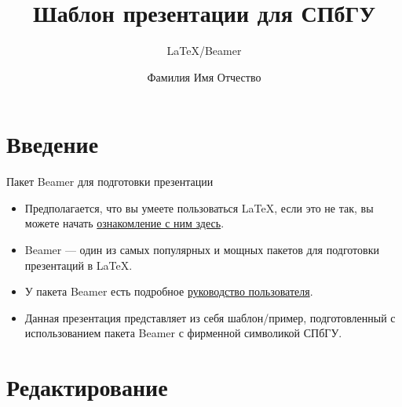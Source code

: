 \documentclass[10pt,aspectratio=169]{beamer}
\title{Шаблон презентации для СПбГУ}
\subtitle{\LaTeX/Beamer}
\author{Фамилия Имя Отчество}
\begin{document}
\maketitle

\section{Введение}

\begin{frame}{Пакет Beamer для подготовки презентации}
\begin{itemize}
\item Предполагается, что вы умеете пользоваться \LaTeX, если это не так, вы можете начать
\href{https://www.latex-project.org/}{ознакомление с ним здесь}.
\item Beamer --- один из самых популярных и мощных пакетов для подготовки презентаций в \LaTeX.
\item У пакета Beamer есть подробное
\href{http://www.ctan.org/tex-archive/macros/latex/contrib/beamer/doc/beameruserguide.pdf}{руководство пользователя}.
\item Данная презентация представляет из себя шаблон/пример, подготовленный с использованием пакета Beamer с фирменной символикой СПбГУ.
\end{itemize}
\end{frame}

\section{Редактирование}

\end{document}
